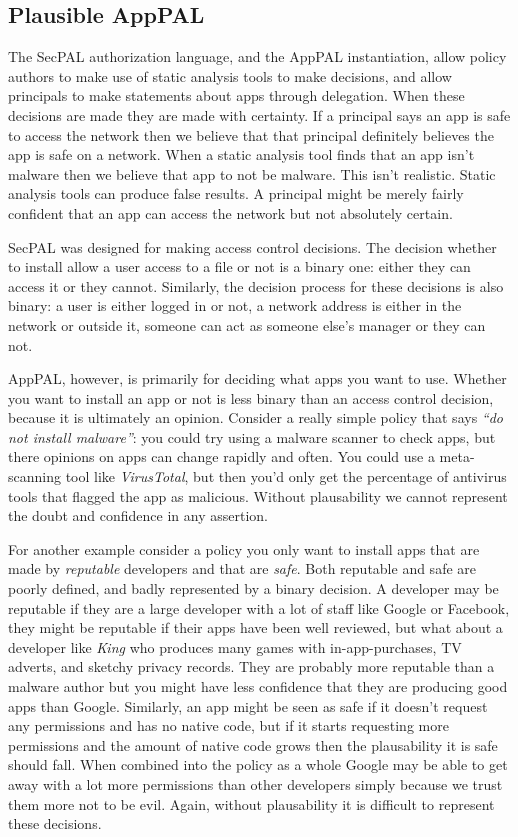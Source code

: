 \documentclass[a4paper]{scrartcl}
\begin{document}
\subsection{Plausible AppPAL}
\label{sec:plausible}

The SecPAL authorization language, and the AppPAL instantiation, allow policy
authors to make use of static analysis tools to make decisions, and allow
principals to make statements about apps through delegation. When these
decisions are made they are made with certainty. If a principal says an app is
safe to access the network then we believe that that principal definitely
believes the app is safe on a network. When a static analysis tool finds that an
app isn't malware then we believe that app to not be malware. This isn't
realistic. Static analysis tools can produce false results. A principal might be
merely fairly confident that an app can access the network but not absolutely
certain.

SecPAL was designed for making access control decisions. The decision whether to
install allow a user access to a file or not is a binary one: either they can
access it or they cannot. Similarly, the decision process for these decisions is
also binary: a user is either logged in or not, a network address is either in
the network or outside it, someone can act as someone else's manager or they can
not.

AppPAL, however, is primarily for deciding what apps you want to use. Whether
you want to install an app or not is less binary than an access control
decision, because it is ultimately an opinion. Consider a really simple policy
that says \emph{``do not install malware''}: you could try using a malware
scanner to check apps, but there opinions on apps can change rapidly and often.
You could use a meta-scanning tool like \emph{VirusTotal}, but then you'd only
get the percentage of antivirus tools that flagged the app as malicious. Without
plausability we cannot represent the doubt and confidence in any assertion.

For another example consider a policy you only want to install apps that are
made by \emph{reputable} developers and that are \emph{safe}. Both reputable and
safe are poorly defined, and badly represented by a binary decision. A developer
may be reputable if they are a large developer with a lot of staff like Google
or Facebook, they might be reputable if their apps have been well reviewed, but
what about a developer like \emph{King} who produces many games with
in-app-purchases, TV adverts, and sketchy privacy records. They are probably
more reputable than a malware author but you might have less confidence that
they are producing good apps than Google. Similarly, an app might be seen as safe
if it doesn't request any permissions and has no native code, but if it starts
requesting more permissions and the amount of native code grows then the
plausability it is safe should fall. When combined into the policy as a whole
Google may be able to get away with a lot more permissions than other developers
simply because we trust them more not to be evil. Again, without plausability it
is difficult to represent these decisions.
\end{document}
